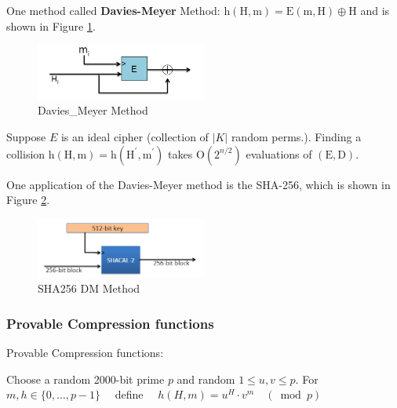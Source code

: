 One method called \textbf{Davies-Meyer} Method: $\mathrm{h}(\mathrm{H}, \mathrm{m})=\mathrm{E}(\mathrm{m}, \mathrm{H}) \oplus \mathrm{H}$  and is shown in Figure \ref{fig: Lecture 4: Davies_Meyer Method}.

\begin{figure}[h]
    \centering
    \includegraphics[width=0.5\textwidth]{Stanford_Crypto_1/fig/04_Integrity/Davies_Meyer Method.png}
    \caption{Davies\_Meyer Method}
    \label{fig: Lecture 4: Davies_Meyer Method}
\end{figure}

\begin{theorem}
    Suppose $E$ is an ideal cipher (collection of $|K|$ random perms.). Finding a collision $\mathrm{h}(\mathrm{H}, \mathrm{m})=\mathrm{h}\left(\mathrm{H}^{\prime}, \mathrm{m}^{\prime}\right)$ takes $\mathrm{O}\left(2^{n / 2}\right)$ evaluations of $(\mathrm{E}, \mathrm{D})$.
\end{theorem}

One application of the Davies-Meyer method is the SHA-256, which is shown in Figure \ref{fig: Lecture 4: SHA256 DM Method}.

\begin{figure}[h]
    \centering
    \includegraphics[width=0.5\textwidth]{Stanford_Crypto_1/fig/04_Integrity/SHA256 DM Method.png}
    \caption{SHA256 DM Method}
    \label{fig: Lecture 4: SHA256 DM Method}
\end{figure}


\subsubsection{Provable Compression functions}

\begin{method}  Provable Compression functions: 

    Choose a random 2000-bit prime $p$ and random $1 \leq u, v \leq p$.
    For $m, h \in\{0, \ldots, p-1\} \quad$ define $\quad h(H, m)=u^{H} \cdot v^{m} \quad(\bmod p)$
\end{method}

